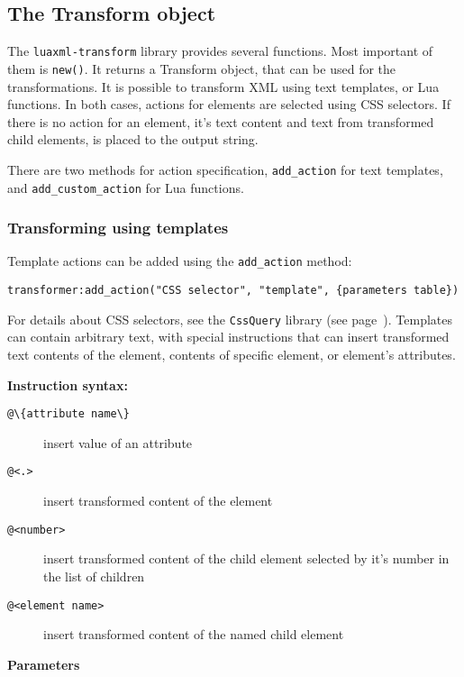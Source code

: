 \documentclass{ltxdoc}
\begin{document}
\subsection{The Transform object }

The \texttt{luaxml-transform} library provides several functions. 
Most important of them is \verb|new()|. It returns a Transform object,
that can be used for the transformations. It is possible to transform 
XML using text templates, or Lua functions. In both cases, actions for
elements are selected using CSS selectors. If there is no action for 
an element, it's text content and text from transformed child elements,
is placed to the output string.

There are two methods for action specification, \verb|add_action| for 
text templates, and \verb|add_custom_action| for Lua functions.

\subsubsection{Transforming using templates}

Template actions can be added using the \verb|add_action| method:

\begin{verbatim}
transformer:add_action("CSS selector", "template", {parameters table})
\end{verbatim}

For details about CSS selectors, see the \texttt{CssQuery} library 
(see page~\pageref{sec:cssquery_library}). Templates can contain 
arbitrary text, with special instructions that can insert transformed
text contents of the element, contents of specific element, or element's
attributes.


\noindent\textbf{Instruction syntax:}

\begin{description}
  \item[\verb|@\{attribute name\}|] insert value of an attribute
  \item[\verb|@<.>|] insert transformed content of the element
  \item[\verb|@<number>|] insert transformed content of the child element
    selected by it's number in the list of children
  \item[\verb|@<element name>|] insert transformed content of the named child element
\end{description}

\noindent\textbf{Parameters}
\end{document}
